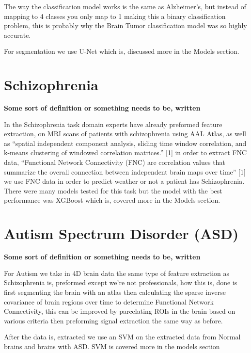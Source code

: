 \documentclass[11pt]{article}
\begin{document}
The way the classification model works is the same as Alzheimer's, but instead of mapping to 4 classes you only map to 1
making this a binary classification problem, this is probably why the Brain Tumor classification model was so highly accurate.

For segmentation we use U-Net which is, discussed more in the Models section.

\section{Schizophrenia}
\label{sec:orga00695b}

\textbf{\textbf{Some sort of definition or something needs to be, written}}

In the Schizophrenia task domain experts have already preformed feature extraction, on MRI scans of patients with
schizophrenia using AAL Atlas, as well as ``spatial independent component analysis, sliding time
window correlation, and k-means clustering of windowed correlation matrices.'' [1] in order to extract FNC data, ``Functional Network
Connectivity (FNC) are correlation values that summarize the overall connection between independent brain maps over time'' [1]
we use FNC data in order to predict weather or not a patient has Schizophrenia. There were many models tested for this task but the
model with the best performance was XGBoost which is, covered more in the Models section.

\section{Autism Spectrum Disorder (ASD)}
\label{sec:org579ad94}

\textbf{\textbf{Some sort of definition or something needs to be, written}}

For Autism we take in 4D brain data the same type of feature extraction as Schizophrenia is, preformed except we're not professionals,
how this is, done is first segmenting the brain with an atlas then calculating the sparse inverse covariance of brain regions over time
to determine Functional Network Connectivity, this can be improved by parcelating ROIs in the brain based on various criteria then preforming
signal extraction the same way as before.

After the data is, extracted we use an SVM on the extracted data from Normal brains and brains with ASD. SVM is covered more in the models section
\end{document}

